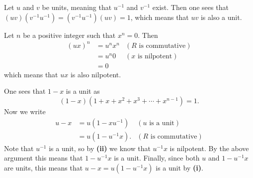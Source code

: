 \begin{questions}
    \item \begin{partquestions}{\roman*}
        \item Let $u$ and $v$ be units, meaning that $u^{-1}$ and $v^{-1}$ exist. Then one sees that $(uv)(v^{-1}u^{-1}) = (v^{-1}u^{-1})(uv) = 1$, which means that $uv$ is also a unit.
        
        \item Let $n$ be a positive integer such that $x^n = 0$. Then
        \begin{align*}
            (ux)^n &= u^nx^n & (R\text{ is commutative})\\
            &= u^n0 & (x \text{ is nilpotent})\\
            &= 0
        \end{align*}
        which means that $ux$ is also nilpotent.

        \item One sees that $1-x$ is a unit as
        \[
            (1-x)(1+x+x^2+x^3+\cdots+x^{n-1}) = 1.    
        \]
        Now we write
        \begin{align*}
            u-x &= u(1-xu^{-1}) & (u \text{ is a unit})\\
            &= u(1-u^{-1}x). & (R \text{ is commutative})
        \end{align*}
        Note that $u^{-1}$ is a unit, so by \textbf{(ii)} we know that $u^{-1}x$ is nilpotent. By the above argument this means that $1-u^{-1}x$ is a unit. Finally, since both $u$ and $1-u^{-1}x$ are units, this means that $u-x = u(1-u^{-1}x)$ is a unit by \textbf{(i)}.
    \end{partquestions}
\end{questions}


